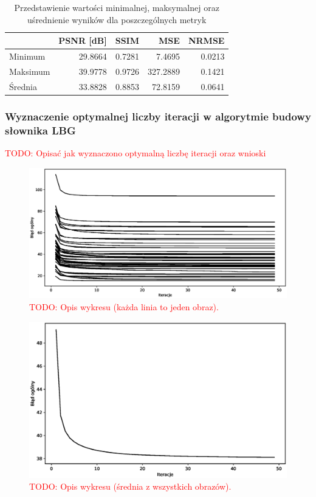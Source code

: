 \documentclass{article}
\newcommand{\todo}[1]{\textcolor{red}{TODO: #1}}
\begin{document}
\begin{table}[H]
\centering
\begin{tabular}{@{}lrrrr@{}}
\toprule
         & PSNR {[}dB{]} & SSIM  & MSE     & NRMSE \\ \midrule
Minimum  & 29.8664       & 0.7281 & 7.4695   & 0.0213 \\
Maksimum & 39.9778       & 0.9726 & 327.2889 & 0.1421 \\
Średnia  & 33.8828       & 0.8853 & 72.8159  & 0.0641 \\ \bottomrule
\end{tabular}
\caption{Przedstawienie wartości minimalnej, maksymalnej oraz uśrednienie wyników dla poszczególnych metryk}
\label{tab:lbg_summary}
\end{table}

\subsubsection{Wyznaczenie optymalnej liczby iteracji w algorytmie budowy słownika LBG}

\todo{Opisać jak wyznaczono optymalną liczbę iteracji oraz wnioski}

\begin{figure}[H]
\centering
  \centering
  \includegraphics[width=.9\linewidth]{images/lbg_4x4_32_50_iterations.eps}  
  \caption{\todo{Opis wykresu (każda linia to jeden obraz).}}
  \label{fig:lbg_iterations}
\end{figure}

\begin{figure}[H]
  \centering
  \includegraphics[width=.9\linewidth]{images/lbg_4x4_32_mean_iterations.eps}  
  \caption{\todo{Opis wykresu (średnia z wszystkich obrazów).}}
  \label{fig:lbg_iterations_mean}
\end{figure}
\end{document}

